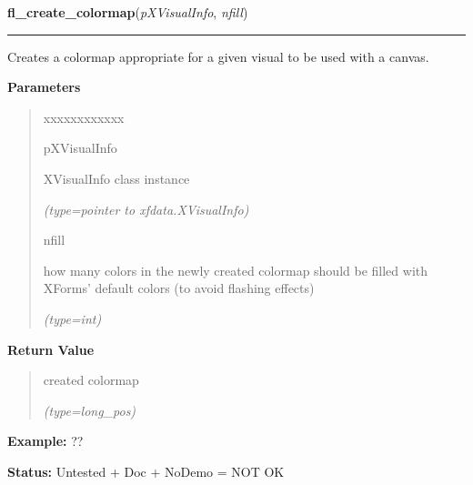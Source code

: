 \hspace{.8\funcindent}\begin{boxedminipage}{\funcwidth}

    \raggedright \textbf{fl\_create\_colormap}(\textit{pXVisualInfo}, \textit{nfill})

    \vspace{-1.5ex}

    \rule{\textwidth}{0.5\fboxrule}
\setlength{\parskip}{2ex}
    Creates a colormap appropriate for a given visual to be used with a 
    canvas.

\setlength{\parskip}{1ex}
      \textbf{Parameters}
      \vspace{-1ex}

      \begin{quote}
        \begin{Ventry}{xxxxxxxxxxxx}

          \item[pXVisualInfo]

          XVisualInfo class instance

            {\it (type=pointer to xfdata.XVisualInfo)}

          \item[nfill]

          how many colors in the newly created colormap should be filled 
          with XForms' default colors (to avoid flashing effects)

            {\it (type=int)}

        \end{Ventry}

      \end{quote}

      \textbf{Return Value}
    \vspace{-1ex}

      \begin{quote}
      created colormap

      {\it (type=long\_pos)}

      \end{quote}

\textbf{Example:} ??



\textbf{Status:} Untested + Doc + NoDemo = NOT OK



    \end{boxedminipage}

    \label{xformslib:flxbasic:fl_wingeometry}

